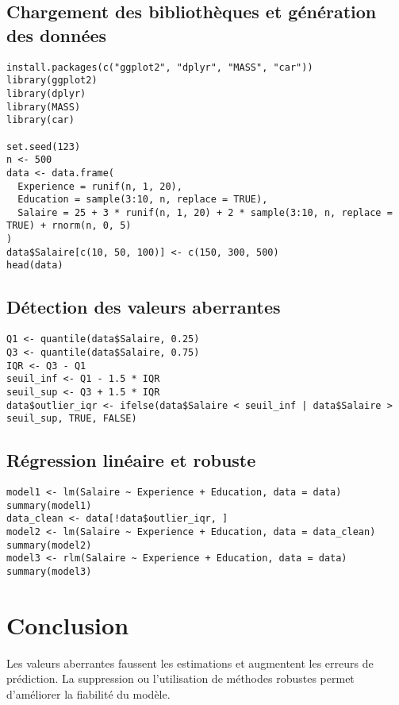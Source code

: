\documentclass[a4paper,12pt]{article}
\begin{document}
\subsection{Chargement des bibliothèques et génération des données}
\begin{lstlisting}[style=Rstyle, caption=Génération des données]
install.packages(c("ggplot2", "dplyr", "MASS", "car"))
library(ggplot2)
library(dplyr)
library(MASS)
library(car)

set.seed(123)
n <- 500
data <- data.frame(
  Experience = runif(n, 1, 20),
  Education = sample(3:10, n, replace = TRUE),
  Salaire = 25 + 3 * runif(n, 1, 20) + 2 * sample(3:10, n, replace = TRUE) + rnorm(n, 0, 5)
)
data$Salaire[c(10, 50, 100)] <- c(150, 300, 500)
head(data)
\end{lstlisting}

\subsection{Détection des valeurs aberrantes}
\begin{lstlisting}[style=Rstyle, caption=Détection des valeurs aberrantes]
Q1 <- quantile(data$Salaire, 0.25)
Q3 <- quantile(data$Salaire, 0.75)
IQR <- Q3 - Q1
seuil_inf <- Q1 - 1.5 * IQR
seuil_sup <- Q3 + 1.5 * IQR
data$outlier_iqr <- ifelse(data$Salaire < seuil_inf | data$Salaire > seuil_sup, TRUE, FALSE)
\end{lstlisting}

\subsection{Régression linéaire et robuste}
\begin{lstlisting}[style=Rstyle, caption=Régression et impact des outliers]
model1 <- lm(Salaire ~ Experience + Education, data = data)
summary(model1)
data_clean <- data[!data$outlier_iqr, ]
model2 <- lm(Salaire ~ Experience + Education, data = data_clean)
summary(model2)
model3 <- rlm(Salaire ~ Experience + Education, data = data)
summary(model3)
\end{lstlisting}

\section{Conclusion}
Les valeurs aberrantes faussent les estimations et augmentent les erreurs de prédiction. La suppression ou l'utilisation de méthodes robustes permet d'améliorer la fiabilité du modèle. 
\end{document}
